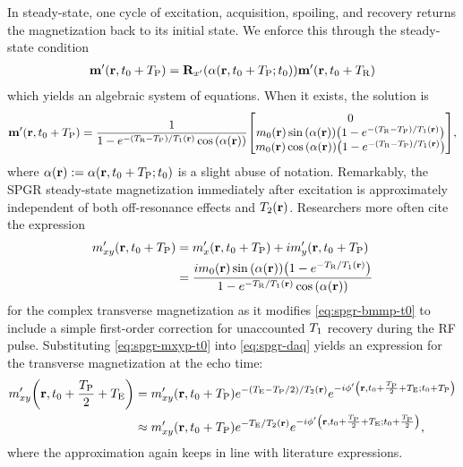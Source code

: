 In steady-state, 
one cycle of excitation, acquisition, spoiling, and recovery 
returns the magnetization back to its initial state.
We enforce this through the steady-state condition
\begin{align}
	\bmmp\paren{\bmr,t_0+\TP} = \bmRxp{\flip\prtzt{t_0+\TP}} \bmmp\paren{\bmr,t_0+\TR}
	\label{eq:spgr-ss}
\end{align}
which yields an algebraic
system of equations.
When it exists,
the solution is
\begin{align}
	\bmmp\paren{\bmr,t_0+\TP} = 
	\frac{1}{1-e^{-\paren{\TR-\TP}/\To\pr}\cosa{\alpha\pr}}
	\begin{bmatrix}
		0 \\
		\mzero\pr \sina{\flip\pr} \paren{1-e^{-\paren{\TR-\TP}/\To\pr}}\\
		\mzero\pr \cosa{\flip\pr} \paren{1-e^{-\paren{\TR-\TP}/\To\pr}}
	\end{bmatrix},
	\label{eq:spgr-bmmp-t0}
\end{align}
where $\flip\pr := \flip\prtzt{t_0+\TP}$ 
is a slight abuse of notation.
Remarkably, 
the SPGR steady-state magnetization
immediately after excitation
is approximately independent
of both off-resonance effects
and $\Tt\pr$.
Researchers more often cite the expression
\begin{align}
	\mxyp\paren{\bmr,t_0+\TP}
	&= \mxp\paren{\bmr,t_0+\TP} + i\myp\paren{\bmr,t_0+\TP} \nonumber \\
	&= \frac{i\mzero\pr \sina{\flip\pr} \paren{1-e^{-\TR/\To\pr}}}
	{1-e^{-\TR/\To\pr}\cosa{\alpha\pr}}
	\label{eq:spgr-mxyp-t0}
\end{align}
for the complex transverse magnetization
as it modifies \eqref{eq:spgr-bmmp-t0}
to include a simple first-order correction
for unaccounted $T_1$ recovery during the RF pulse.
Substituting \eqref{eq:spgr-mxyp-t0} 
into \eqref{eq:spgr-daq} 
yields an expression 
for the transverse magnetization
at the echo time:
\begin{align}
	\mxyp\paren{\bmr,t_0+\frac{\TP}{2}+\TE} 
	&=
	\mxyp\paren{\bmr,t_0+\TP} 
	e^{-(\TE-\TP/2)/\Tt\pr} 
	e^{-i\php\paren{\bmr,t_0+\frac{\TP}{2}+\TE;t_0+\TP}} \nonumber \\
	&\approx
	\mxyp\paren{\bmr,t_0+\TP} 
	e^{-\TE/\Tt\pr} 
	e^{-i\php\paren{\bmr,t_0+\frac{\TP}{2}+\TE;t_0+\frac{\TP}{2}}},
	\label{eq:spgr-mxyp-te}
\end{align}
where the approximation
again keeps in line 
with literature expressions.

